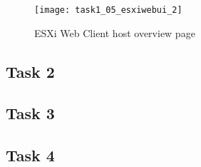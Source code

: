 \begin{figure}[H]
  \centering
  \captionsetup{skip=2pt}
  \texttt{[image: task1\_05\_esxiwebui\_2]}
  \caption{ESXi Web Client host overview page}
  \label{fig:task1:esxiwebui_02}
\end{figure}

\subsection{Task 2}

\subsection{Task 3}

\subsection{Task 4}
